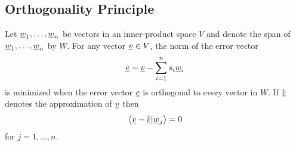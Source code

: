 \subsection{Orthogonality Principle}

\begin{theorem}
Let $\underline{w}_1, \ldots, \underline{w}_n$ be vectors in an inner-product space $V$ and denote the span of $\underline{w}_1, \ldots, \underline{w}_n$ by $W$.
For any vector $\underline{v} \in V$, the norm of the error vector
\begin{equation} \label{equation:OrthogonalProjectionError}
\underline{e} = \underline{v} - \sum_{i=1}^n s_i \underline{w}_i
\end{equation}
is minimized when the error vector $\underline{e}$ is orthogonal to every vector in $W$.
If $\hat{\underline{v}}$ denotes the  approximation of $\underline{v}$ then
\begin{equation*}
\left\langle \underline{v} - \hat{\underline{v}} | \underline{w}_j \right\rangle = 0
\end{equation*}
for $j = 1, \ldots, n$.
\end{theorem}
